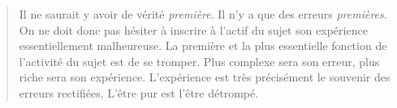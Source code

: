 \begin{quote} 
\small
\og{}Il ne saurait y avoir de vérité \textit{première}. Il n'y a que des erreurs \textit{premières}. On ne doit donc pas hésiter à inscrire à l'actif du sujet son expérience essentiellement malheureuse. La première et la plus essentielle fonction de l'activité du sujet est de se tromper. Plus complexe sera son erreur, plus riche sera son expérience. L'expérience est très précisément le souvenir des erreurs rectifiées. L'être pur est l'être détrompé. \fg{} 

\end{quote}


